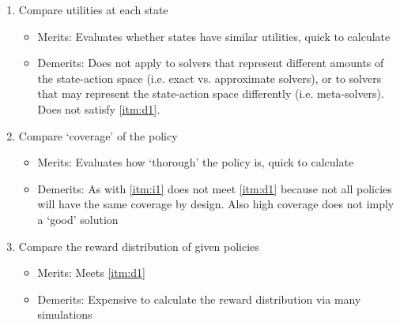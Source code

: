     \begin{enumerate}
        \item Compare utilities at each state \label{itm:i1}
        \begin{itemize}
            \item Merits: Evaluates whether states have similar utilities, quick to calculate
            \item Demerits: Does not apply to solvers that represent different amounts of the state-action space (i.e. exact vs. approximate solvers), or to solvers that may represent the state-action space differently (i.e. meta-solvers). Does not satisfy \ref{itm:d1}.
        \end{itemize} 
        \item Compare `coverage' of the policy \label{itm:i2}
        \begin{itemize}
            \item Merits: Evaluates how `thorough' the policy is, quick to calculate
            \item Demerits: As with \ref{itm:i1} does not meet \ref{itm:d1} because not all policies will have the same coverage by design. Also high coverage does not imply a `good' solution
        \end{itemize}
        \item Compare the reward distribution of given policies \label{itm:i3}
        \begin{itemize}
            \item Merits: Meets \ref{itm:d1}
            \item Demerits: Expensive to calculate the reward distribution via many simulations
        \end{itemize}
    \end{enumerate}
